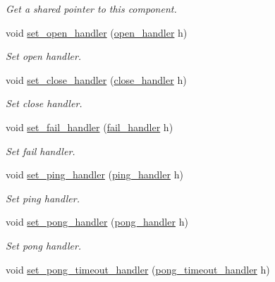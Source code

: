 \begin{DoxyCompactItemize}
\begin{DoxyCompactList}\small\item\em Get a shared pointer to this component. \end{DoxyCompactList}\item 
void \hyperlink{classwebsocketpp_1_1connection_ab11271e7778fbfde3a1987fca729af6d}{set\+\_\+open\+\_\+handler} (\hyperlink{namespacewebsocketpp_a53c8b4ae59cf13b5f883b119bbd14d72}{open\+\_\+handler} h)
\begin{DoxyCompactList}\small\item\em Set open handler. \end{DoxyCompactList}\item 
void \hyperlink{classwebsocketpp_1_1connection_a25fb7096431b1d7350c34035db7ed9a4}{set\+\_\+close\+\_\+handler} (\hyperlink{namespacewebsocketpp_a27acb39e01cbca06ccc4e4e8eb8f877d}{close\+\_\+handler} h)
\begin{DoxyCompactList}\small\item\em Set close handler. \end{DoxyCompactList}\item 
void \hyperlink{classwebsocketpp_1_1connection_a8d2515bc6821f90c531efe77c8a32569}{set\+\_\+fail\+\_\+handler} (\hyperlink{namespacewebsocketpp_a5bb2e61cfe649b2e012f1a2c5693a4d5}{fail\+\_\+handler} h)
\begin{DoxyCompactList}\small\item\em Set fail handler. \end{DoxyCompactList}\item 
void \hyperlink{classwebsocketpp_1_1connection_a6e21e63abbbba88f818742e9da25fa8b}{set\+\_\+ping\+\_\+handler} (\hyperlink{namespacewebsocketpp_a9dcaaa7370865f1bcacb55ae715793ef}{ping\+\_\+handler} h)
\begin{DoxyCompactList}\small\item\em Set ping handler. \end{DoxyCompactList}\item 
void \hyperlink{classwebsocketpp_1_1connection_a298795eaa6d554ca5114ff23346d47a9}{set\+\_\+pong\+\_\+handler} (\hyperlink{namespacewebsocketpp_a1798d54e6d98a481cf870091af84bc1f}{pong\+\_\+handler} h)
\begin{DoxyCompactList}\small\item\em Set pong handler. \end{DoxyCompactList}\item 
void \hyperlink{classwebsocketpp_1_1connection_a6baa576fffc7af7685cf75894d634fb7}{set\+\_\+pong\+\_\+timeout\+\_\+handler} (\hyperlink{namespacewebsocketpp_a2c5925a111b9e553efebea35d5ea155f}{pong\+\_\+timeout\+\_\+handler} h)

\end{DoxyCompactItemize}
